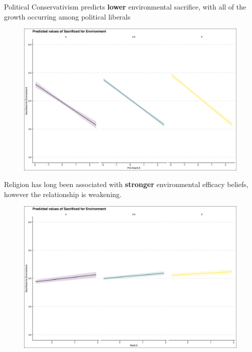 \documentclass{beamer}
\begin{document}
\begin{frame}{Political Conservativism predicts {\bf lower} environmental sacrifice, with all of the growth occurring among political liberals}
\begin{figure}
\includegraphics[width=.8\textwidth,height=\textheight,keepaspectratio]{Figures/SACRIFICEMADE_Pol.Orient.S.png}
\end{figure}
\end{frame}


\begin{frame}{Religion has long been associated with {\bf stronger} environmental efficacy beliefs, however the relationship is weakening.}
\begin{figure}
\includegraphics[width=.8\textwidth,height=\textheight,keepaspectratio]{Figures/SACRIFICEMADE_RELIDS_T.png}
\end{figure}
\end{frame}
\end{document}
